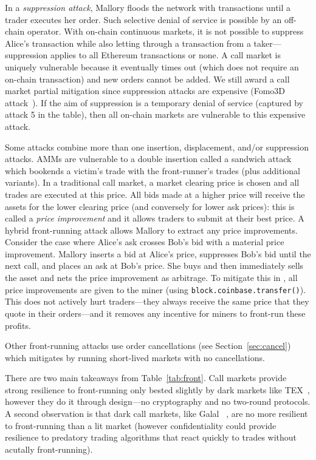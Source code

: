 In a \emph{suppression attack}, Mallory floods the network with transactions until a trader executes her order. Such selective denial of service is possible by an off-chain operator. With on-chain continuous markets, it is not possible to suppress Alice's transaction while also letting through a transaction from a taker---suppression applies to all Ethereum transactions or none. A call market is uniquely vulnerable because it eventually times out (which does not require an on-chain transaction) and new orders cannot be added. We still award a call market partial mitigation since suppression attacks are expensive (\cf Fomo3D attack~\cite{eskandari2019sok}). If the aim of suppression is a temporary denial of service (captured by attack 5 in the table), then all on-chain markets are vulnerable to this expensive attack.

Some attacks combine more than one insertion, displacement, and/or suppression attacks. AMMs are vulnerable to a double insertion called a sandwich attack~\cite{ZQFLG21} which bookends a victim's trade with the front-runner's trades (plus additional variants). In a traditional call market, a market clearing price is chosen and all trades are executed at this price. All bids made at a higher price will receive the assets for the lower clearing price (and conversely for lower ask prices): this is called a \textit{price improvement} and it allows traders to submit at their best price. A hybrid front-running attack allows Mallory to extract any price improvements. Consider the case where Alice's ask crosses Bob's bid with a material price improvement. Mallory inserts a bid at Alice's price, suppresses Bob's bid until the next call, and places an ask at Bob's price. She buys and then immediately sells the asset and nets the price improvement as arbitrage. To mitigate this in \cm, all price improvements are given to the miner (using \texttt{block.coinbase.transfer()}). This does not actively hurt traders---they always receive the same price that they quote in their orders---and it removes any incentive for miners to front-run these profits.

Other front-running attacks use order cancellations (see Section~\ref{sec:cancel}) which \cm mitigates by running short-lived markets with no cancellations.

There are two main takeaways from Table~\ref{tab:front}. Call markets provide strong resilience to front-running only bested slightly by dark markets like TEX~\cite{khalil2019tex}, however they do it through design---no cryptography and no two-round protocols. A second observation is that dark call markets, like Galal \etal~\cite{galalpublicly}, are no more resilient to front-running than a lit market (however confidentiality could provide resilience to predatory trading algorithms that react quickly to trades without acutally front-running).


